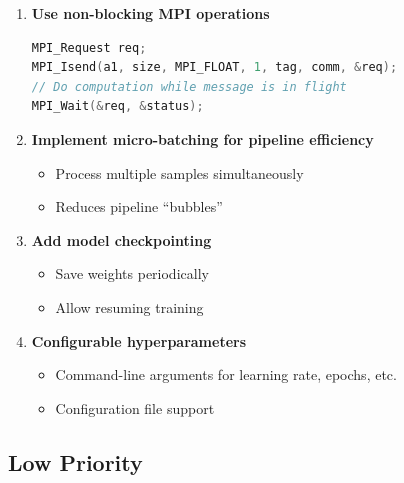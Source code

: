 \documentclass[11pt,a4paper]{article}
\begin{document}
\begin{enumerate}
    \item \textbf{Use non-blocking MPI operations}
    \begin{lstlisting}[language=C]
MPI_Request req;
MPI_Isend(a1, size, MPI_FLOAT, 1, tag, comm, &req);
// Do computation while message is in flight
MPI_Wait(&req, &status);
    \end{lstlisting}
    
    \item \textbf{Implement micro-batching for pipeline efficiency}
    \begin{itemize}
        \item Process multiple samples simultaneously
        \item Reduces pipeline ``bubbles''
    \end{itemize}
    
    \item \textbf{Add model checkpointing}
    \begin{itemize}
        \item Save weights periodically
        \item Allow resuming training
    \end{itemize}
    
    \item \textbf{Configurable hyperparameters}
    \begin{itemize}
        \item Command-line arguments for learning rate, epochs, etc.
        \item Configuration file support
    \end{itemize}
\end{enumerate}

\subsection{Low Priority}
\end{document}
